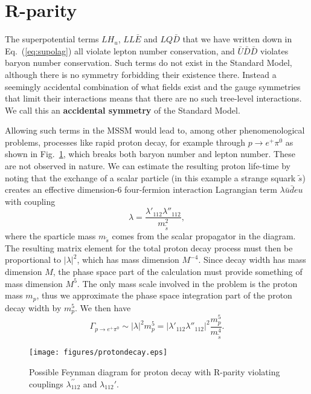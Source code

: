 \documentclass[notes.tex]{subfiles}
\begin{document}
\section{R-parity}
The superpotential terms $LH_u$, $LL\bar{E}$ and $LQ\bar{D}$ that we have written down in Eq.~(\ref{eq:supolag}) all violate lepton number conservation, and $\bar{U}\bar{D}\bar{D}$ violates baryon number conservation. Such terms do not exist in the Standard Model, although there is no symmetry forbidding their existence there. Instead a seemingly accidental combination of what fields exist and the gauge symmetries that limit their interactions means that there are no such tree-level interactions. We call this an {\bf accidental symmetry} of the Standard Model.  

Allowing such terms in the MSSM would lead to, among other phenomenological problems, processes like rapid proton decay, for example through $p\to e^+ \pi^0$ as shown in Fig.~\ref{fig:proton}, which breaks both baryon number and lepton number. These are not observed in nature. We can estimate the resulting proton life-time by noting that the exchange of a scalar particle (in this example a strange squark $\tilde s$) creates an effective dimension-6 four-fermion interaction Lagrangian term $\lambda\bar u \bar deu$ with coupling 
\begin{equation}
\lambda = \frac{\lambda'_{112}\lambda''_{112}}{m_{\tilde{s}}^2},
\end{equation}
where the sparticle mass $m_{\tilde s}$ comes from the scalar propagator in the diagram. The resulting matrix element for the total proton decay process must then be proportional to $|\lambda|^2$, which has mass dimension $M^{-4}$. Since decay width has mass dimension $M$, the phase space part of the calculation must provide something of mass dimension $M^5$.
The only mass scale involved in the problem is the proton mass $m_p$, thus we approximate the phase space integration part of the proton decay width by $m_p^5$. We then have
\begin{equation}
\Gamma_{p\to e^+ \pi^0} \sim |\lambda|^2 m_p^5 = |\lambda'_{112}\lambda''_{112}|^2\frac{m_p^5}{m_{\tilde{s}}^4}.
\end{equation}

\begin{figure}[h]
\begin{center}
\texttt{[image: figures/protondecay.eps]}
\caption{Possible Feynman diagram for proton decay with R-parity violating couplings $\lambda_{112}^{\prime\prime}$ and $\lambda_{112}'$.\label{fig:proton}}
\end{center}
\end{figure}
\end{document}
